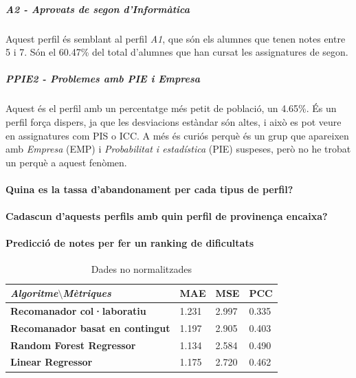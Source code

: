 \documentclass[12pt,a4paper,catalan]{article}
\begin{document}
\subparagraph{A2 - Aprovats de segon d'Informàtica}
Aquest perfil és semblant al perfil \textit{A1}, que són els alumnes que tenen notes entre 5 i 7. Són el 60.47\% del total d'alumnes que han cursat les assignatures de segon.

\subparagraph{PPIE2 - Problemes amb PIE i Empresa}
Aquest és el perfil amb un percentatge més petit de població, un 4.65\%. És un perfil força dispers, ja que les desviacions estàndar són altes, i això es pot veure en assignatures com PIS o ICC. A més és curiós perquè és un grup que apareixen amb \textit{Empresa} (EMP) i \textit{Probabilitat i estadística} (PIE) suspeses, però no he trobat un perquè a aquest fenòmen.

\paragraph{Quina es la tassa d'abandonament per cada tipus de perfil?}

\paragraph{Cadascun d'aquests perfils amb quin perfil de provinença encaixa?}


\paragraph{Predicció de notes per fer un ranking de dificultats}



\begin{table}[h]
\centering
\begin{tabular}{@{}llll@{}}
\toprule
\textit{\textbf{Algoritme$\setminus$Mètriques}}   & \textbf{MAE} & \textbf{MSE} & \textbf{PCC} \\ \midrule
\textbf{Recomanador col·laboratiu}      & 1.231        & 2.997        & 0.335        \\
\textbf{Recomanador basat en contingut} & 1.197        & 2.905        & 0.403        \\
\textbf{Random Forest Regressor}        & 1.134        & 2.584        & 0.490        \\
\textbf{Linear Regressor}               & 1.175        & 2.720        & 0.462        \\ \bottomrule
\end{tabular}
\caption{Dades no normalitzades}
\end{table}
\end{document}
